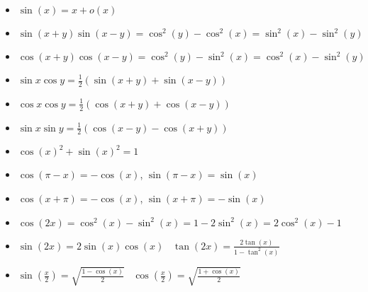 \documentclass[]{article}
\begin{document}
\begin{multicols*}{3}
    \begin{itemize}
    \item$\sin(x) = x + o(x)$
    \item $\sin(x+y)\sin(x-y) = \cos^2(y) - \cos^2(x) = \sin^2(x) - \sin^2(y)$
    \item $\cos(x+y)\cos(x-y) = \cos^2(y) - \sin^2(x) = \cos^2(x) - \sin^2(y)$
    \item $\sin{x}\cos{y} = \frac{1}{2}(\sin(x+y) + \sin(x-y))$ 
    \item $\cos{x}\cos{y} = \frac{1}{2}(\cos(x+y) + \cos(x-y))$
    \item  $\sin{x}\sin{y} = \frac{1}{2}(\cos(x-y)-\cos(x+y))$
    \item $\cos(x)^2 + \sin(x)^2 = 1$
    \item $\cos(\pi-x) = -\cos(x)$, $\sin(\pi-x) = \sin(x)$
    \item $\cos(x+\pi) = -\cos(x)$, $\sin(x+\pi) = -\sin(x)$
    \item $\cos(2x) = \cos^2(x) - \sin^2(x) = 1-2\sin^2(x) = 2\cos^2(x) - 1$
    \item $\sin(2x) = 2\sin(x)\cos(x)$ \ $\tan(2x) = \frac{2\tan(x)}{1-\tan^2(x)}$
    \item $\sin(\frac{x}{2}) = \sqrt{\frac{1-\cos(x)}{2}}$ \ $\cos(\frac{x}{2}) = \sqrt{\frac{1+\cos(x)}{2}}$

\end{itemize}
\end{multicols*}
\end{document}
